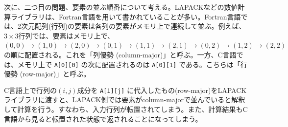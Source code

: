 次に、二つ目の問題、要素の並ぶ順番について考える。LAPACKなどの数値計算ライブラリは、Fortran言語を用いて書かれていることが多い。Fortran言語では、2次元配列(行列)の要素は各列の要素がメモリ上で連続して並ぶ。例えば、$3 \times 3$行列では、要素はメモリ上で、$(0,0) \rightarrow (1,0) \rightarrow (2,0) \rightarrow (0,1) \rightarrow (1,1) \rightarrow (2,1) \rightarrow (0,2) \rightarrow (1,2) \rightarrow (2,2)$ の順に配置される。これを「列優勢 (column-major)」と呼ぶ。一方、C言語では、メモリ上で \verb|A[0][0]| の次に配置されるのは \verb|A[0][1]| である。こちらは「行優勢 (row-major)」と呼ぶ。
\begin{figure}[H]
\begin{center}
\end{center}
\end{figure}
C言語上で行列の$(i,j)$成分を \verb|A[i][j]| に代入したもの(row-major)をLAPACKライブラリに渡すと、LAPACK側では要素がcolumn-majorで並んでいると解釈して計算を行う。すなわち、入力行列が転置されてしまう。また、計算結果もC言語から見ると転置された状態で返されることになってしまう。

